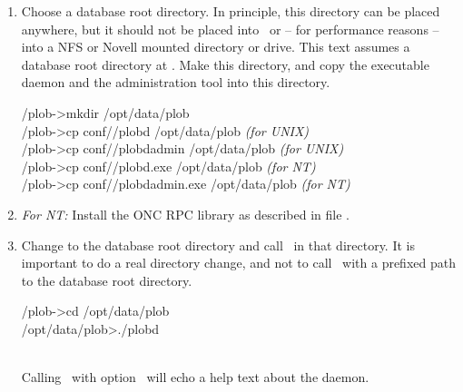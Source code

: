 \begin{enumerate}
\item Choose a database root directory. In principle, this directory
  can be placed anywhere, but it should not be placed into
  \ or -- for performance reasons -- into a NFS or Novell
  mounted directory or drive. This text assumes a database root
  directory at . Make this directory,
  and copy the executable daemon and the administration tool into this
  directory.\\[\smallskipamount]
\begin{tt}\CodeSize
\td/plob-\thisversion>mkdir /opt/data/plob\\
\td/plob-\thisversion>cp conf/\shortosname/plobd /opt/data/plob
\hspace*{\fill}\textrm{\emph{(for UNIX)}}\\
\td/plob-\thisversion>cp conf/\shortosname/plobdadmin /opt/data/plob
\hspace*{\fill}\textrm{\emph{(for UNIX)}}\\
\td/plob-\thisversion>cp conf/\shortosname/plobd.exe /opt/data/plob
\hspace*{\fill}\textrm{\emph{(for NT)}}\\
\td/plob-\thisversion>cp conf/\shortosname/plobdadmin.exe /opt/data/plob
\hspace*{\fill}\textrm{\emph{(for NT)}}
\end{tt}

\item \emph{For NT:} Install the ONC RPC library as described in file
\href{../oncrpc-1.12/doc/usage.htm}{}.

\item Change to the database root directory and call \ in
that directory. It is important to do a real directory change, and not
to call \ with a prefixed path to the database root
directory.\\[\smallskipamount]
\begin{tt}\CodeSize
\td/plob-\thisversion>cd /opt/data/plob\\
/opt/data/plob>./plobd
\end{tt}\\[\smallskipamount]
Calling \ with option \ will echo a help text
about the daemon.


\end{enumerate}

